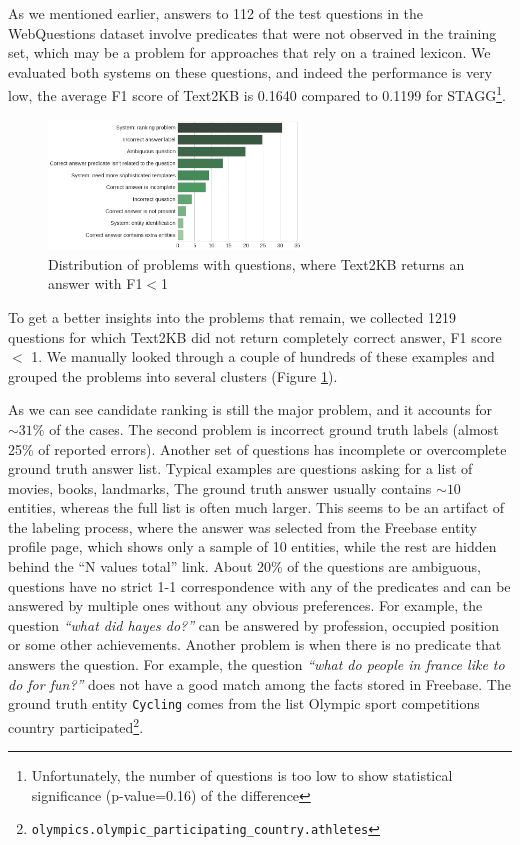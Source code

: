 As we mentioned earlier, answers to 112 of the test questions in the WebQuestions dataset involve predicates that were not observed in the training set, which may be a problem for approaches that rely on a trained lexicon.
We evaluated both systems on these questions, and indeed the performance is very low, \ie the average F1 score of Text2KB is 0.1640 compared to 0.1199 for STAGG\footnote{Unfortunately, the number of questions is too low to show statistical significance (p-value=0.16) of the difference}.

\begin{figure}
\centering
\includegraphics[width=0.6\textwidth]{img/error_analysis}
\caption{Distribution of problems with questions, where Text2KB returns an answer with F1$<$1}
\label{figure:text2kb:error_analysis}
\end{figure}

To get a better insights into the problems that remain, we collected 1219 questions for which Text2KB did not return completely correct answer, \ie F1 score $<$ 1.
We manually looked through a couple of hundreds of these examples and grouped the problems into several clusters (Figure \ref{figure:text2kb:error_analysis}).

As we can see candidate ranking is still the major problem, and it accounts for $\sim31\%$ of the cases.
The second problem is incorrect ground truth labels (almost 25\% of reported errors).
Another set of questions has incomplete or overcomplete ground truth answer list.
Typical examples are questions asking for a list of movies, books, landmarks, \etc
The ground truth answer usually contains $\sim10$ entities, whereas the full list is often much larger.
This seems to be an artifact of the labeling process, where the answer was selected from the Freebase entity profile page, which shows only a sample of 10 entities, while the rest are hidden behind the ``N values total'' link.
About 20\% of the questions are ambiguous, \ie questions have no strict 1-1 correspondence with any of the predicates and can be answered by multiple ones without any obvious preferences.
For example, the question \textit{``what did hayes do?''} can be answered by profession, occupied position or some other achievements.
Another problem is when there is no predicate that answers the question.
For example, the question \textit{``what do people in france like to do for fun?''} does not have a good match among the facts stored in Freebase.
The ground truth entity \texttt{Cycling} comes from the list Olympic sport competitions country participated\footnote{\texttt{olympics.olympic\_participating\_country.athletes}}.

